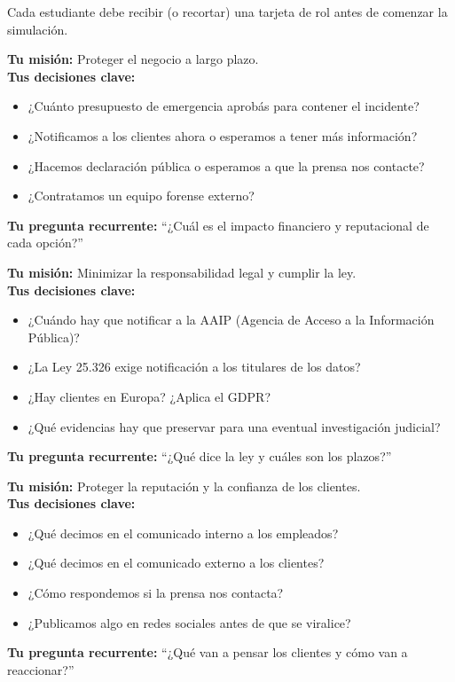 \documentclass[12pt,a4paper]{article}
\begin{document}
Cada estudiante debe recibir (o recortar) una tarjeta de rol antes de comenzar la simulaci\'on.

\begin{cajaRolGerente}
\textbf{Tu misi\'on:} Proteger el negocio a largo plazo.\\[4pt]
\textbf{Tus decisiones clave:}
\begin{itemize}[leftmargin=1.5em]
    \item ¿Cu\'anto presupuesto de emergencia aprob\'as para contener el incidente?
    \item ¿Notificamos a los clientes ahora o esperamos a tener m\'as informaci\'on?
    \item ¿Hacemos declaraci\'on p\'ublica o esperamos a que la prensa nos contacte?
    \item ¿Contratamos un equipo forense externo?
\end{itemize}
\textbf{Tu pregunta recurrente:} ``¿Cu\'al es el impacto financiero y reputacional de cada opci\'on?''
\end{cajaRolGerente}

\vspace{6pt}

\begin{cajaRolLegal}
\textbf{Tu misi\'on:} Minimizar la responsabilidad legal y cumplir la ley.\\[4pt]
\textbf{Tus decisiones clave:}
\begin{itemize}[leftmargin=1.5em]
    \item ¿Cu\'ando hay que notificar a la AAIP (Agencia de Acceso a la Informaci\'on P\'ublica)?
    \item ¿La Ley 25.326 exige notificaci\'on a los titulares de los datos?
    \item ¿Hay clientes en Europa? ¿Aplica el GDPR?
    \item ¿Qu\'e evidencias hay que preservar para una eventual investigaci\'on judicial?
\end{itemize}
\textbf{Tu pregunta recurrente:} ``¿Qu\'e dice la ley y cu\'ales son los plazos?''
\end{cajaRolLegal}

\vspace{6pt}

\begin{cajaRolComunicaciones}
\textbf{Tu misi\'on:} Proteger la reputaci\'on y la confianza de los clientes.\\[4pt]
\textbf{Tus decisiones clave:}
\begin{itemize}[leftmargin=1.5em]
    \item ¿Qu\'e decimos en el comunicado interno a los empleados?
    \item ¿Qu\'e decimos en el comunicado externo a los clientes?
    \item ¿C\'omo respondemos si la prensa nos contacta?
    \item ¿Publicamos algo en redes sociales antes de que se viralice?
\end{itemize}
\textbf{Tu pregunta recurrente:} ``¿Qu\'e van a pensar los clientes y c\'omo van a reaccionar?''
\end{cajaRolComunicaciones}
\end{document}
